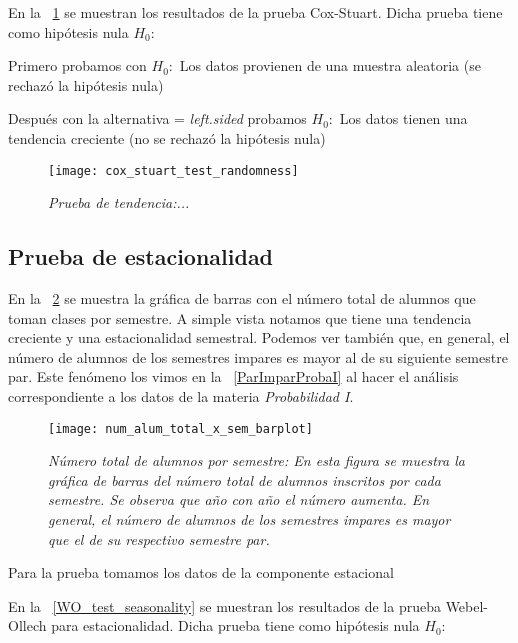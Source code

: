 En la \figurename{~\ref{coxStuartTest_randomness}} se muestran los resultados de la prueba Cox-Stuart. Dicha prueba tiene como hipótesis nula $H_{0}:$ 

Primero probamos con $H_{0}:$ Los datos provienen de una muestra aleatoria (se rechazó la hipótesis nula)

Después con la alternativa = \textit{left.sided} probamos $H_{0}:$ Los datos tienen una tendencia creciente (no se rechazó la hipótesis nula)

\begin{figure}[H]
\centering
\texttt{[image: cox\_stuart\_test\_randomness]} %
\caption[\textit{Prueba de tendencia}]{\textit{Prueba de tendencia:...}}\label{coxStuartTest_randomness}
\end{figure}



\subsection{Prueba de estacionalidad}

En la \figurename{~\ref{TotalAlumBarras}} se muestra la gráfica de barras con el número total de alumnos que toman clases por semestre. A simple vista notamos que tiene una tendencia creciente y una estacionalidad semestral. Podemos ver también que, en general, el número de alumnos de los semestres impares es mayor al de su siguiente semestre par. Este fenómeno los vimos en la \figurename{~\ref{ParImparProbaI}} al hacer el análisis correspondiente a los datos de la materia \textit{Probabilidad I}.

\begin{figure}[H]
\centering
\texttt{[image: num\_alum\_total\_x\_sem\_barplot]} %
\caption[\textit{Número total de alumnos por semestre}]{\textit{Número total de alumnos por semestre: En esta figura se muestra la gráfica de barras del número total de alumnos inscritos por cada semestre. Se observa que año con año el número aumenta. En general, el número de alumnos de los semestres impares es mayor que el de su respectivo semestre par.}}\label{TotalAlumBarras}
\end{figure}


Para la prueba tomamos los datos de la componente estacional


En la \figurename{~\ref{WO_test_seasonality}} se muestran los resultados de la prueba Webel-Ollech para estacionalidad. Dicha prueba tiene como hipótesis nula $H_{0}:$ 

